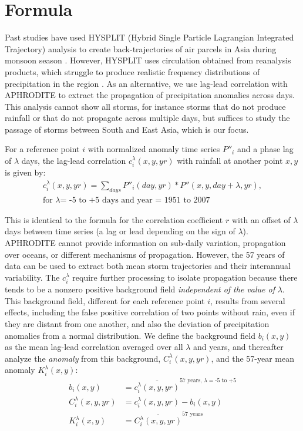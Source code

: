 \section{Formula}

	Past studies have used HYSPLIT (Hybrid Single Particle Lagrangian Integrated Trajectory) analysis to create back-trajectories of air parcels in Asia during monsoon season \parencite{Medina2010,Cai2012,Gao2013}. However, HYSPLIT uses circulation obtained from reanalysis products, which struggle to produce realistic frequency distributions of precipitation in the region \parencite{Pena-Arancibia2013}. As an alternative, we use lag-lead correlation with APHRODITE to extract the propagation of precipitation anomalies across days. This analysis cannot show all storms, for instance storms that do not produce rainfall or that do not propagate across multiple days, but suffices to study the passage of storms between South and East Asia, which is our focus.
	
	For a reference point $i$ with normalized anomaly time series $P''_i$ and a phase lag of $\lambda$ days, the lag-lead correlation $c_i^\lambda(x,y,yr)$ with rainfall at another point $x,y$ is given by:
\begin{gather*}
	c_i^\lambda(x,y,yr)=\sum_{days}P''_i(day,yr)*P''(x,y,day+\lambda,yr),\\
	\text{for } \lambda \text{= -5 to +5 days and year = 1951 to 2007}
\end{gather*}
	
	 This is identical to the formula for the correlation coefficient $r$ with an offset of $\lambda$ days between time series (a lag or lead depending on the sign of $\lambda$). APHRODITE cannot provide information on sub-daily variation, propagation over oceans, or different mechanisms of propagation. However, the 57 years of data can be used to extract both mean storm trajectories and their interannual variability. The $c_i^\lambda$ require further processing to isolate propagation because there tends to be a nonzero positive background field \textit{independent of the value of} $\lambda$. This background field, different for each reference point $i$, results from several effects, including the false positive correlation of two points without rain, even if they are distant from one another, and also the deviation of precipitation anomalies from a normal distribution. We define the background field $b_i(x,y)$ as the mean lag-lead correlation averaged over all $\lambda$ and years, and thereafter analyze the \textit{anomaly} from this background, $C_i^\lambda(x,y,yr)$, and the 57-year mean anomaly $K_i^\lambda(x,y)$:
\begin{align*}
	b_i(x,y) &=\overline{c_i^\lambda(x,y,yr)}^{57\text{ years, }\lambda = \text{-5 to +5}} \\
	C_i^\lambda(x,y,yr) &= c_i^\lambda(x,y,yr)-b_i(x,y) \\
	K_i^\lambda(x,y) &= \overline{C_i^\lambda(x,y,yr)}^{57\text{ years}}
\end{align*}
		
